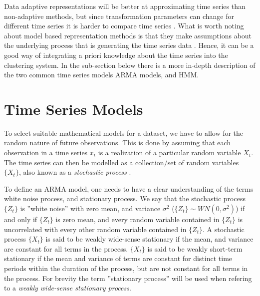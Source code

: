 Data adaptive representations will be better at approximating time series than non-adaptive methods, but since transformation parameters can change for different time series it is harder to compare time series \cite{tsc_rev}. What is worth noting about model based representation methods is that they make assumptions about the underlying process that is generating the time series data \cite{ts_data_mining}. Hence, it can be a good way of integrating a priori knowledge about the time series into the clustering system. %
In the sub-section below there is a more in-depth description of the two common time series models ARMA models, and HMM. %

\section{Time Series Models}
To select suitable mathematical models for a dataset, we have to allow for the random nature of future observations. This is done by assuming that each observation in a time series $x_t$ is a realization of a particular random variable $X_t$. The time series can then be modelled as a collection/set of random variables $\{X_t\}$, also known as a \textit{stochastic process} \cite{brockwell_davis_advanced}. \newline

To define an ARMA model, one needs to have a clear understanding of the terms white noise process, and stationary process. We say that the stochastic process $\{Z_t\}$ is ''white noise'' with zero mean, and variance $\sigma^2$ ($\{Z_t\} \sim WN(0, \sigma^2)$) if and only if $\{Z_t\}$ is zero mean, and every random variable contained in $\{Z_t\}$ is uncorrelated with every other random variable contained in $\{Z_t\}$. %
A stochastic process $\{X_t\}$ is said to be weakly wide-sense stationary if the mean, and variance are constant for all terms in the process. $\{X_t\}$ is said to be weakly short-term stationary if the mean and variance of terms are constant for distinct time periods within the duration of the process, but are not constant for all terms in the process. For brevity the term ''stationary process'' will be used when refering to a \textit{weakly wide-sense stationary process}. 

